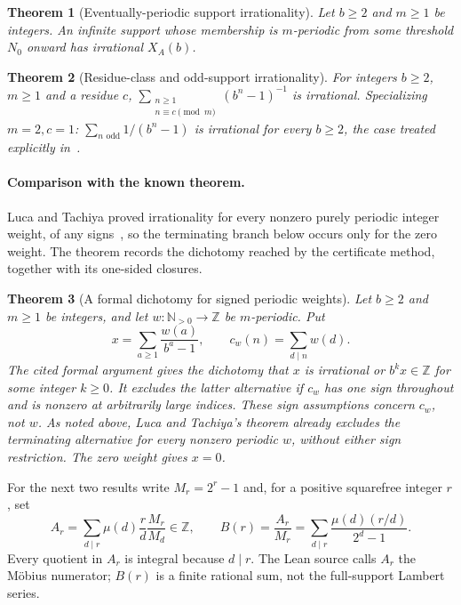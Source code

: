 \documentclass[11pt]{article}
\theoremstyle{plain}
\newtheorem{thm}{Theorem}[section]
\theoremstyle{definition}
\theoremstyle{remark}
\newcommand{\Npos}{\mathbb{N}_{>0}}
\newcommand{\Z}{\mathbb{Z}}
\begin{document}
\begin{thm}[Eventually-periodic support irrationality]
\label{thm:eventually-periodic}
Let $b\ge2$ and $m\ge1$ be integers.  An infinite support whose
membership is $m$-periodic from some threshold $N_0$ onward has
irrational $X_A(b)$.
\end{thm}

\begin{thm}[Residue-class and odd-support irrationality]
\label{thm:residue-odd}
For integers $b\ge2$, $m\ge1$ and a residue $c$,
$\sum_{\substack{n\ge1\\n\equiv c\pmod m}}(b^n-1)^{-1}$ is
irrational. Specializing $m=2,c=1$: $\sum_{n\text{ odd}} 1/(b^n-1)$ is irrational for
every $b\ge 2$, the case treated explicitly in~\cite[Example~2, p.~140]{lucatachiya2017}.
\end{thm}

\paragraph{Comparison with the known theorem.} Luca and Tachiya proved irrationality for every
nonzero purely periodic integer weight, of any signs~\cite[Theorem~A, p.~139]{lucatachiya2017}, so
the terminating branch below occurs only for the zero weight.  The theorem records the dichotomy
reached by the certificate method, together with its one-sided closures.

\begin{thm}[A formal dichotomy for signed periodic weights]
\label{thm:signed-periodic}
Let $b\ge2$ and $m\ge1$ be integers, and let
$w:\Npos\to\Z$ be $m$-periodic.  Put
\[
 x=\sum_{a\ge1}\frac{w(a)}{b^a-1},\qquad
 c_w(n)=\sum_{d\mid n}w(d).
\]
The cited formal argument gives the dichotomy that $x$ is
irrational or $b^kx\in\Z$ for some integer $k\ge0$.
It excludes the latter alternative if $c_w$ has one sign
throughout and is nonzero at arbitrarily large indices.
These sign assumptions concern $c_w$, not $w$.
As noted above, Luca and Tachiya's theorem already excludes
the terminating alternative for every nonzero periodic $w$,
without either sign restriction.  The zero weight gives $x=0$.
\end{thm}

For the next two results write $M_r=2^r-1$ and, for a positive
squarefree integer $r$, set
\[
 A_r=\sum_{d\mid r}\mu(d)\frac rd\frac{M_r}{M_d}\in\Z,
 \qquad B(r)=\frac{A_r}{M_r}
           =\sum_{d\mid r}\frac{\mu(d)(r/d)}{2^d-1}.
\]
Every quotient in $A_r$ is integral because $d\mid r$.
The Lean source calls $A_r$ the M\"obius numerator; $B(r)$ is a finite
rational sum, not the full-support Lambert series.
\end{document}
